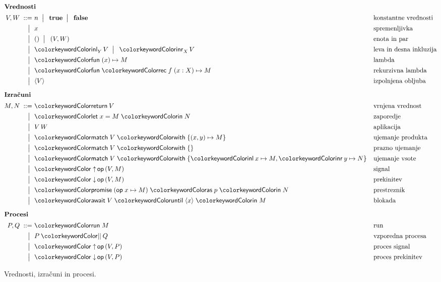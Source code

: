 \begin{figure}[h]
	\parbox{\textwidth}{
		\centering
		\small
		\begin{align*}
		\intertext{\textbf{Vrednosti}}
		V, W
		\bnfis& n \bnfor\! \true \bnfor\! \false        & &\text{konstantne vrednosti} \\
		\bnfor& x                                       & &\text{spremenljivka} \\
		\bnfor& \tmunit \bnfor\! \tmpair{V}{W}          & &\text{enota in par} \\
		\bnfor& \tminl[Y]{V} \bnfor\! \tminr[X]{V}      & &\text{leva in desna inkluzija} \\
		\bnfor& \tmfun{x}{M}                        & &\text{lambda} \\
		\bnfor& \tmfunrec{f}{x : X}{M}                        & &\text{rekurzivna lambda} \\
		\bnfor& \tmpromise V                            & &\text{izpolnjena obljuba}
		\\[1ex]
		\intertext{\textbf{Izračuni}}
		M, N
		\bnfis& \tmreturn{V}                            & &\text{vrnjena vrednost} \\
		\bnfor& \tmlet{x}{M}{N}                         & &\text{zaporedje} \\
		\bnfor& V\,W                                    & &\text{aplikacija} \\
		\bnfor& \tmmatch{V}{\tmpair{x}{y} \mapsto M}    & &\text{ujemanje produkta} \\
		\bnfor& \tmmatch[]{V}{}                        & &\text{prazno ujemanje} \\
		\bnfor& \tmmatch{V}{\tminl{x} \mapsto M, \tminr{y} \mapsto N}	& &\text{ujemanje vsote} \\
		\bnfor& \tmopout{op}{V}{M}       & &\text{signal} \\
		\bnfor& \tmopin{op}{V}{M}          & &\text{prekinitev} \\
		\bnfor& \tmwith{op}{x}{M}{p}{N}      & &\text{prestreznik} \\
		\bnfor& \tmawait{V}{x}{M}             & &\text{blokada}
			\\[1ex]
		\intertext{\textbf{Procesi}}
		  P, Q
		\bnfis & \tmrun M & & \text{run} \\
		\bnfor & \tmpar P Q & & \text{vzporedna procesa} \\
		\bnfor & \tmopout{op}{V}{P} & & \text{proces signal} \\
		\bnfor & \tmopin{op}{V}{P} & & \text{proces prekinitev}
		\end{align*}
	} 
	\caption{Vrednosti, izračuni in procesi.}
	\label{fig:izrazi}
\end{figure}


